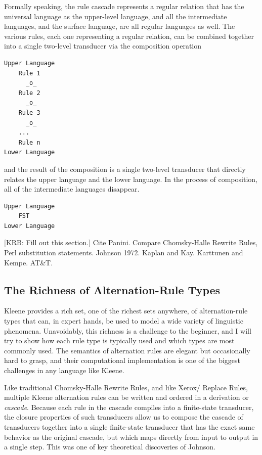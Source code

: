 \noindent
Formally speaking, the rule cascade represents a regular relation that
has the universal language as
the upper-level language, and all the intermediate languages, and the surface language, are all regular
languages as well.  The various rules, each one representing a regular relation, can be combined
together into a single two-level transducer via the composition operation

\begin{samepage}
\begin{Verbatim}
Upper Language
    Rule 1
      _o_
    Rule 2
      _o_
    Rule 3
      _o_
    ...
    Rule n
Lower Language
\end{Verbatim}
\end{samepage}

\noindent
and the result of the composition is a single two-level transducer that directly relates the upper
language and the lower language.  In the process of composition, all of the intermediate languages disappear.

\begin{Verbatim}
Upper Language
	FST
Lower Language
\end{Verbatim}


[KRB:  Fill out this section.]  Cite Panini.  Compare Chomsky-Halle Rewrite Rules, Perl substitution statements.
Johnson 1972.  Kaplan and Kay.  Karttunen and Kempe.  AT\&T.


\subsection{The Richness of Alternation-Rule Types}

Kleene provides a rich set, one of the richest sets anywhere, of alternation-rule types
that can, in expert hands, be used to model a wide variety of linguistic phenomena.
Unavoidably, this richness is a challenge to the beginner, and I will try to show how
each rule type is typically used and which types are most commonly used.  The semantics
of alternation rules are elegant but occasionally hard to grasp, and their computational
implementation is one of the biggest challenges in any language like Kleene.

Like traditional Chomsky-Halle Rewrite Rules, and like Xerox/ Replace Rules,
multiple Kleene alternation rules can be written and ordered in a derivation or
\emph{cascade}.  Because each rule in the cascade compiles into a finite-state transducer,
the closure properties of such transducers allow us to compose the cascade of transducers
together into a single finite-state transducer that has the exact same behavior as the
original cascade, but which maps directly from input to output in a single step.  This
was one of key theoretical discoveries of Johnson.

